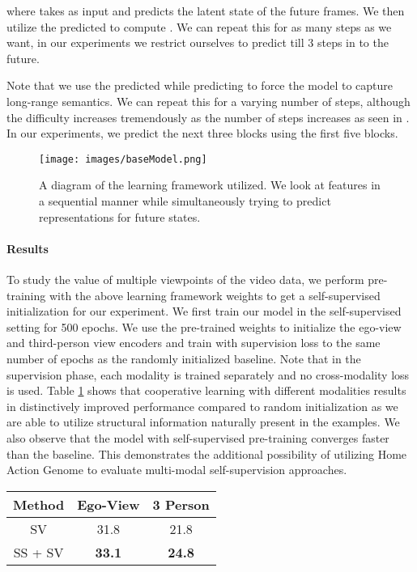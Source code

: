 \documentclass[final]{cvpr}
\begin{document}
where  takes  as input and predicts the latent state of the future frames. We then utilize the predicted  to compute . We can repeat this for as many steps as we want, in our experiments we restrict ourselves to predict till 3 steps in to the future.
 
Note that we use the predicted  while predicting  to force the model to capture long-range semantics. We can repeat this for a varying number of steps, although the difficulty increases tremendously as the number of steps increases as seen in \cite{dpc}. In our experiments, we predict the next three blocks using the first five blocks.

\begin{figure}[t]
      \centering
        \texttt{[image: images/baseModel.png]}
        \caption{A diagram of the learning framework utilized. We look at features in a sequential manner while simultaneously trying to predict representations for future states.}
        \label{learningFramework}
\end{figure}

\paragraph{Results} To study the value of multiple viewpoints of the video data, we perform pre-training with the above learning framework weights to get a self-supervised initialization for our experiment. We first train our model in the self-supervised setting for 500 epochs. We use the pre-trained weights to initialize the ego-view and third-person view encoders and train with supervision loss to the same number of epochs as the randomly initialized baseline. Note that in the supervision phase, each modality is trained separately and no cross-modality loss is used. Table \ref{table:self_sup} shows that cooperative learning with different modalities results in distinctively improved performance compared to random initialization as we are able to utilize structural information naturally present in the examples. We also observe that the model with self-supervised pre-training converges faster than the baseline. This demonstrates the additional possibility of utilizing Home Action Genome to evaluate multi-modal self-supervision approaches.

\begin{table}[t]
  \centering
    \begin{tabular}{c|c|c} 
     \toprule
     Method & Ego-View & 3 Person\\
     \midrule
     SV & 31.8 & 21.8 \\
     SS + SV & \textbf{33.1} & \textbf{24.8} \\
     \bottomrule
    \end{tabular}
    \label{table:self_sup}
\end{table}
\end{document}
